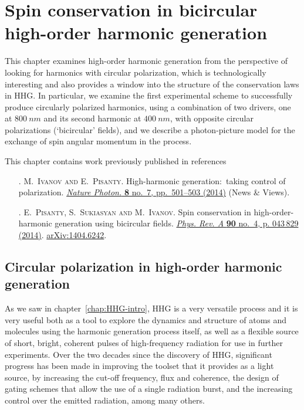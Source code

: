 



\chapter{Spin conservation in bicircular high-order harmonic generation}
\label{chap:spin-HHG}
This chapter examines high-order harmonic generation from the perspective of looking for harmonics with circular polarization, which is technologically interesting and also provides a window into the structure of the conservation laws in HHG. In particular, we examine the first experimental scheme to successfully produce circularly polarized harmonics, using a combination of two drivers, one at $\SI{800}{nm}$ and its second harmonic at $\SI{400}{nm}$, with opposite circular polarizations (`bicircular' fields), and we describe a photon-picture model for the exchange of spin angular momentum in the process.





This chapter contains work previously published in references

\begin{enumerate}
\item[{\hypersetup{citecolor=black}\citealp{Ivanov_nature_photonics_2014}}.]
\textsc{M.~Ivanov and E.~Pisanty}.
\newblock High-harmonic generation:\ taking control of polarization.
\newblock \href{http://dx.doi.org/10.1038/nphoton.2014.141}{
          \emph{Nature Photon.} \textbf{8} no.~7, pp.~501--503 (2014)} (News \& Views).

\item[{\hypersetup{citecolor=black}\citealp{Pisanty_spin_conservation_2014}}.]
\textsc{E.~Pisanty, S.~Sukiasyan and M.~Ivanov}.
\newblock Spin conservation in high-order-harmonic generation using bicircular fields. 
\newblock \href{http://dx.doi.org/10.1103/PhysRevA.90.043829}{
          \emph{Phys. Rev. A} \textbf{90} no.~4, p. 043\,829 (2014)}.
\newblock \href{http://arxiv.org/abs/1404.6242}{{arXiv}:1404.6242}.

\end{enumerate}





\section{Circular polarization in high-order harmonic generation}
\label{sec:circular-harmonics-intro}
As we saw in chapter~\ref{chap:HHG-intro}, HHG is a very versatile process and it is very useful both as a tool to explore the dynamics and structure of atoms and molecules using the harmonic generation process itself, as well as a flexible source of short, bright, coherent pulses of high-frequency radiation for use in further experiments. Over the two decades since the discovery of HHG, significant progress has been made in improving the toolset that it provides as a light source, by increasing the cut-off frequency, flux and coherence, the design of gating schemes that allow the use of a single radiation burst, and the increasing control over the emitted radiation, among many others.


